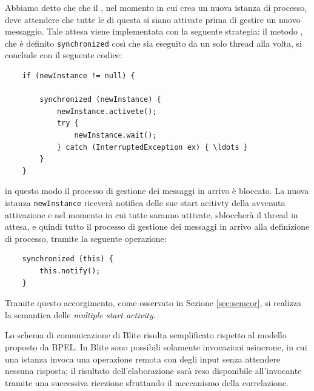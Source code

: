 Abbiamo detto che che il , nel momento in cui crea un nuova
istanza di processo, deve attendere che tutte le  di questa
si siano attivate prima di gestire un nuovo messaggio.
Tale attesa viene implementata con la seguente strategia: il metodo
, che è definito \texttt{synchronized} così che
sia eseguito da un solo thread alla volta, si conclude con il seguente codice:
\begin{lstlisting}
	if (newInstance != null) {
            
		synchronized (newInstance) {
			newInstance.activete();
			try {
				newInstance.wait();
    		} catch (InterruptedException ex) { \ldots }
    	}
	}
\end{lstlisting}
in questo modo il processo di gestione dei messaggi in arrivo è bloccato. La
nuova istanza \texttt{newInstance} riceverà notifica delle sue start acitivty
della avvenuta attivazione e nel momento in cui tutte saranno attivate,
sbloccherà il thread in attesa, e quindi tutto il processo di gestione dei
messaggi in arrivo alla definizione di processo, tramite la seguente operazione:
\begin{lstlisting}
	synchronized (this) {
    	this.notify();
    }
\end{lstlisting}
Tramite questo accorgimento, come osservato in Sezione \ref{sec:semcor}, si
realizza la semantica delle \emph{multiple start activity}.
\vspace{0.5cm}

Lo schema di comunicazione di Blite risulta semplificato rispetto al modello
proposto da BPEL. In Blite sono possibili solamente invocazioni asincrone, in
cui una istanza invoca una operazione remota con degli input senza attendere
nessuna risposta; il risultato dell'elaborazione sarà reso disponibile
all'invocante tramite una successiva ricezione sfruttando il meccanismo della
correlazione. 

